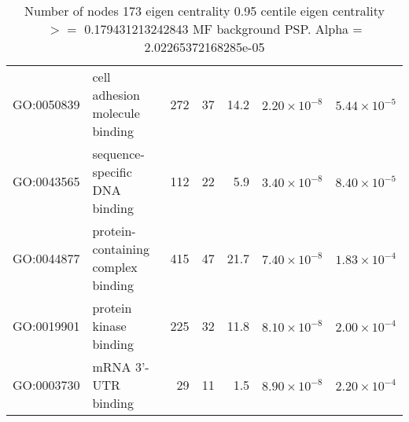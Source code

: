 \begin{table}[ht]
\begin{adjustbox}{max width=\textwidth}
\begin{tabular}{llrrrrr}
  GO:0050839 & cell adhesion molecule binding & 272 & 37 & 14.2 & $2.20 \times 10^{-8}$ & $5.44 \times 10^{-5}$ \\ 
  GO:0043565 & sequence-specific DNA binding & 112 & 22 & 5.9 & $3.40 \times 10^{-8}$ & $8.40 \times 10^{-5}$ \\ 
  GO:0044877 & protein-containing complex binding & 415 & 47 & 21.7 & $7.40 \times 10^{-8}$ & $1.83 \times 10^{-4}$ \\ 
  GO:0019901 & protein kinase binding & 225 & 32 & 11.8 & $8.10 \times 10^{-8}$ & $2.00 \times 10^{-4}$ \\ 
  GO:0003730 & mRNA 3'-UTR binding & 29 & 11 & 1.5 & $8.90 \times 10^{-8}$ & $2.20 \times 10^{-4}$ \\ 
   \hline
\end{tabular}
\end{adjustbox}
\caption{Number of nodes 173 eigen centrality 0.95 centile  eigen centrality $>=$ 0.179431213242843 MF background PSP. Alpha = 2.02265372168285e-05} 
\label{tab:Number of nodes 173 eigen centrality 0.95 centile  eigen centrality $>=$ 0.179431213242843 MF background PSP. Alpha = 2.02265372168285e-05}
\end{table}



